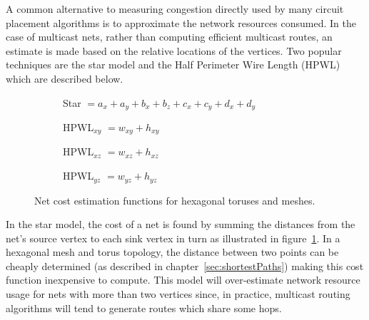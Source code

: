 				A common alternative to measuring congestion directly used by many
				circuit placement algorithms is to approximate the network resources
				consumed. In the case of multicast nets, rather than computing
				efficient multicast routes, an estimate is made based on the relative
				locations of the vertices. Two popular techniques are the star model
				and the Half Perimeter Wire Length (HPWL)~\cite{kahng11} which are
				described below.
				
				\begin{figure}
					\center
					\begin{subfigure}[b]{\linewidth}
						\center
						
						\caption{Star $= a_x + a_y + b_x + b_z + c_x + c_y + d_x + d_y$}
						\label{fig:cost-function-star}
					\end{subfigure}
					
					\vspace*{1.5em}
					
					\begin{subfigure}[b]{0.32\linewidth}
						\center
						
						\caption{HPWL$_{xy}$ $= w_{xy} + h_{xy}$}
						\label{fig:cost-function-hpwl-xy}
					\end{subfigure}
					\begin{subfigure}[b]{0.32\linewidth}
						\center
						
						\caption{HPWL$_{xz}$ $= w_{xz} + h_{xz}$}
						\label{fig:cost-function-hpwl-xz}
					\end{subfigure}
					\begin{subfigure}[b]{0.32\linewidth}
						\center
						
						\caption{HPWL$_{yz}$ $= w_{yz} + h_{yz}$}
						\label{fig:cost-function-hpwl-yz}
					\end{subfigure}
					
					\caption[Net cost estimation functions for hexagonal toruses.]%
					{Net cost estimation functions for hexagonal toruses and meshes.}
					\label{fig:cost-function}
				\end{figure}
				
				In the star model, the cost of a net is found by summing the distances
				from the net's source vertex to each sink vertex in turn as illustrated
				in figure~\ref{fig:cost-function-star}. In a hexagonal mesh and torus
				topology, the distance between two points can be cheaply determined (as
				described in chapter~\ref{sec:shortestPaths}) making this cost function
				inexpensive to compute. This model will over-estimate network resource
				usage for nets with more than two vertices since, in practice,
				multicast routing algorithms will tend to generate routes which share
				some hops.
				
